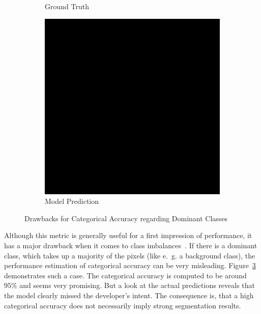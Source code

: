 \begin{figure}[h]
\begin{subfigure}{\CategoricalAccuracyImageWidth}
        \caption{Ground Truth}
        \label{fig:ca_truth}
    \end{subfigure}
    \hfill
    \begin{subfigure}{\CategoricalAccuracyImageWidth}
        \includegraphics[width=\textwidth]{images/categorical_accuracy_prediction}
        \caption{Model Prediction}
        \label{fig:ca_prediction}
    \end{subfigure}
    \hfill
    \caption[Drawbacks for Categorical Accuracy regarding Dominant Classes]{Drawbacks for Categorical Accuracy regarding Dominant Classes~\cite{tds_segmentation18}}
    \label{fig:categorical_accuracy_drawbacks}
\end{figure}

Although this metric is generally useful for a first impression of performance, it has a major drawback when it comes to class imbalances~\cite{tds_segmentation18}. If there is a dominant class, which takes up a majority of the pixels (like e.~g. a background class), the performance estimation of categorical accuracy can be very misleading. Figure~\ref{fig:categorical_accuracy_drawbacks} demonstrates such a case. The categorical accuracy is computed to be around $95\%$ and seems very promising. But a look at the actual predictions reveals that the model clearly missed the developer's intent. The consequence is, that a high categorical accuracy does not necessarily imply strong segmentation results.

